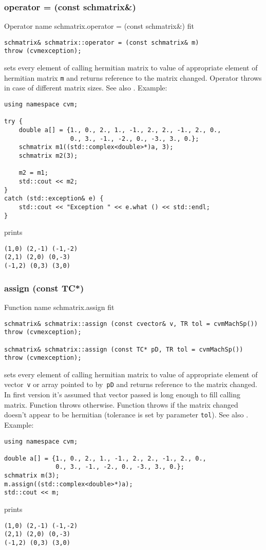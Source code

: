 \subsubsection{operator = (const schmatrix\&)}
Operator%
\pdfdest name {schmatrix.operator = (const schmatrix&)} fit
\begin{verbatim}
schmatrix& schmatrix::operator = (const schmatrix& m)
throw (cvmexception);
\end{verbatim}
sets  every element of  calling hermitian matrix to  value of
appropriate element of  hermitian matrix \verb"m"
and returns  reference to
the matrix changed.
Operator throws  
in case of different matrix sizes.
See also .
Example:
\begin{Verbatim}
using namespace cvm;

try {
    double a[] = {1., 0., 2., 1., -1., 2., 2., -1., 2., 0.,
                  0., 3., -1., -2., 0., -3., 3., 0.};
    schmatrix m1((std::complex<double>*)a, 3);
    schmatrix m2(3);
    
    m2 = m1;
    std::cout << m2;
}
catch (std::exception& e) {
    std::cout << "Exception " << e.what () << std::endl;
}
\end{Verbatim}
prints
\begin{Verbatim}
(1,0) (2,-1) (-1,-2)
(2,1) (2,0) (0,-3)
(-1,2) (0,3) (3,0)
\end{Verbatim}
\newpage



\subsubsection{assign (const TC*)}
Function%
\pdfdest name {schmatrix.assign} fit
\begin{verbatim}
schmatrix& schmatrix::assign (const cvector& v, TR tol = cvmMachSp())
throw (cvmexception);

schmatrix& schmatrix::assign (const TC* pD, TR tol = cvmMachSp())
throw (cvmexception);
\end{verbatim}
sets every element of  calling hermitian matrix to  value of
appropriate element of  vector~\verb'v'
or  array pointed to by~\verb"pD"
and returns  reference to
the matrix changed.
In first version it's assumed that vector passed is long
enough to fill calling matrix. Function throws  
otherwise.
Function throws  
if the matrix changed doesn't appear to be hermitian 
(tolerance is set by parameter \verb'tol').
See also .
Example:
\begin{Verbatim}
using namespace cvm;

double a[] = {1., 0., 2., 1., -1., 2., 2., -1., 2., 0.,
              0., 3., -1., -2., 0., -3., 3., 0.};
schmatrix m(3);
m.assign((std::complex<double>*)a);
std::cout << m;
\end{Verbatim}
prints
\begin{Verbatim}
(1,0) (2,-1) (-1,-2)
(2,1) (2,0) (0,-3)
(-1,2) (0,3) (3,0)
\end{Verbatim}
\newpage



